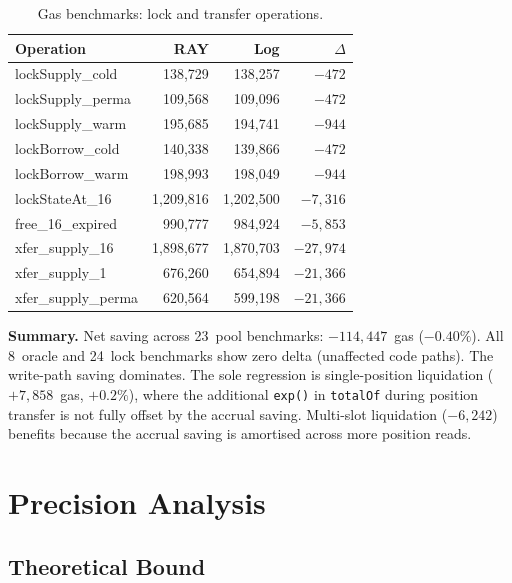\documentclass[10pt,a4paper,twocolumn]{article}
\begin{document}
\begin{table}[htbp]
\centering
\caption{Gas benchmarks: lock and transfer operations.}
\label{tab:gas-lock}
\small
\begin{tabular*}{0.95\columnwidth}{@{\extracolsep{\fill}}lrrr@{}}
\toprule
Operation & RAY & Log & $\Delta$ \\
\midrule
lockSupply\_cold & 138,729 & 138,257 & $-472$ \\
lockSupply\_perma & 109,568 & 109,096 & $-472$ \\
lockSupply\_warm & 195,685 & 194,741 & $-944$ \\
lockBorrow\_cold & 140,338 & 139,866 & $-472$ \\
lockBorrow\_warm & 198,993 & 198,049 & $-944$ \\
lockStateAt\_16 & 1,209,816 & 1,202,500 & $-7{,}316$ \\
free\_16\_expired & 990,777 & 984,924 & $-5{,}853$ \\
xfer\_supply\_16 & 1,898,677 & 1,870,703 & $-27{,}974$ \\
xfer\_supply\_1 & 676,260 & 654,894 & $-21{,}366$ \\
xfer\_supply\_perma & 620,564 & 599,198 & $-21{,}366$ \\
\bottomrule
\end{tabular*}
\end{table}

\textbf{Summary.} Net saving across 23~pool benchmarks: $-114{,}447$~gas ($-0.40\%$). All 8~oracle and 24~lock benchmarks show zero delta (unaffected code paths). The write-path saving dominates. The sole regression is single-position liquidation ($+7{,}858$~gas, $+0.2\%$), where the additional \texttt{exp()} in \texttt{totalOf} during position transfer is not fully offset by the accrual saving. Multi-slot liquidation ($-6{,}242$) benefits because the accrual saving is amortised across more position reads.

\section{Precision Analysis}
\label{sec:precision}

\subsection{Theoretical Bound}
\label{subsec:precision-theory}
\end{document}
